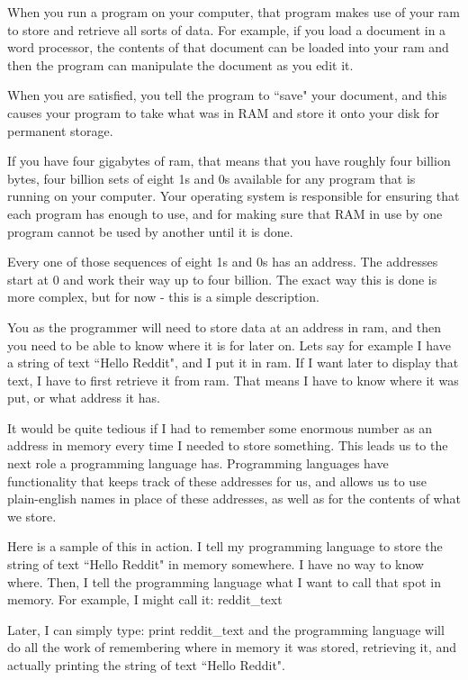 \documentclass[a4paper,12pt]{article}
\begin{document}
When you run a program on your computer, that program makes use of your ram to store and retrieve all sorts of data. For example, if you load a document in a word processor, the contents of that document can be loaded into your ram and then the program can manipulate the document as you edit it.

When you are satisfied, you tell the program to ``save" your document, and this causes your program to take what was in RAM and store it onto your disk for permanent storage.

If you have four gigabytes of ram, that means that you have roughly four billion bytes, four billion sets of eight 1s and 0s available for any program that is running on your computer. Your operating system is responsible for ensuring that each program has enough to use, and for making sure that RAM in use by one program cannot be used by another until it is done.

Every one of those sequences of eight 1s and 0s has an address. The addresses start at 0 and work their way up to four billion. The exact way this is done is more complex, but for now - this is a simple description.

You as the programmer will need to store data at an address in ram, and then you need to be able to know where it is for later on. Lets say for example I have a string of text ``Hello Reddit", and I put it in ram. If I want later to display that text, I have to first retrieve it from ram. That means I have to know where it was put, or what address it has.

It would be quite tedious if I had to remember some enormous number as an address in memory every time I needed to store something. This leads us to the next role a programming language has. Programming languages have functionality that keeps track of these addresses for us, and allows us to use plain-english names in place of these addresses, as well as for the contents of what we store.

Here is a sample of this in action. I tell my programming language to store the string of text ``Hello Reddit" in memory somewhere. I have no way to know where. Then, I tell the programming language what I want to call that spot in memory. For example, I might call it: reddit\_text

Later, I can simply type: print reddit\_text and the programming language will do all the work of remembering where in memory it was stored, retrieving it, and actually printing the string of text ``Hello Reddit".
\end{document}

